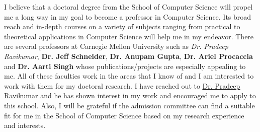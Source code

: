 \documentclass{article}
\begin{document}
I believe that a doctoral degree from the School of Computer Science will propel me a long way in my goal to become a professor in Computer Science. Its broad reach and in-depth courses on a  variety of subjects ranging from practical to theoretical applications in Computer Science will help me in my endeavor. There are several professors at Carnegie Mellon University such as \textit{Dr. Pradeep Ravikumar}, \textbf{Dr. Jeff Schneider}, \textbf{Dr. Anupam Gupta}, \textbf{Dr. Ariel Procaccia} and \textbf{Dr. Aarti Singh} whose publications/projects are especially appealing to me. All of these faculties work in the areas that I know of and I am interested to work with them for my doctoral research. I have reached out to \underline{\color{red}\href{http://www.cs.cmu.edu/~pradeepr/}{Dr. Pradeep Ravikumar}} and he has shown interest in my work and encouraged me to apply to this school. Also, I will be grateful if the admission committee can find a suitable fit for me in the School of Computer Science based on my research experience and interests.








\end{document}

